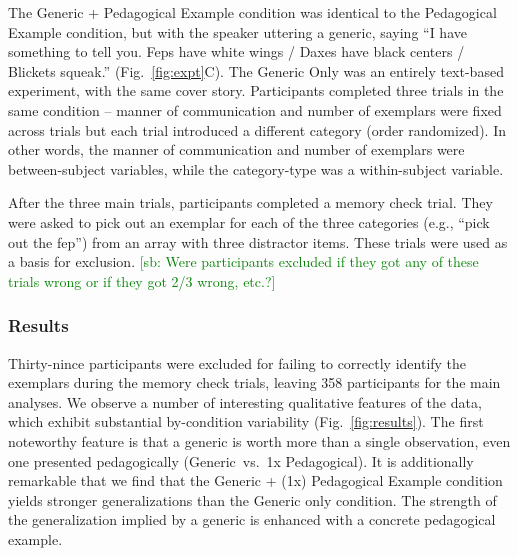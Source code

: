 \documentclass[10pt,letterpaper]{article}
\newcommand{\soph}[1]{\textcolor{Green}{[sb: #1]}}
\begin{document}
The Generic + Pedagogical Example condition was identical to the Pedagogical Example condition, but with the speaker uttering a generic, saying ``I have something to tell you. Feps have white wings / Daxes have black centers / Blickets squeak.'' (Fig.~\ref{fig:expt}C). 
The Generic Only was an entirely text-based experiment, with the same cover story. 
Participants completed three trials in the same condition -- manner of communication and number of exemplars were fixed across trials but each trial introduced a different category (order randomized). In other words, the manner of communication and number of exemplars were between-subject variables, while the category-type was a within-subject variable. 

After the three main trials, participants completed a memory check trial. They were asked to pick out an exemplar for each of the three categories (e.g., ``pick out the fep'') from an array with three distractor items. These trials were used as a basis for exclusion. \soph{Were participants excluded if they got any of these trials wrong or if they got 2/3 wrong, etc.?}










\subsubsection{Results}



Thirty-nince participants were excluded for failing to correctly identify the exemplars during the memory check trials, leaving 358 participants for the main analyses.
We observe a number of interesting qualitative features of the data, which exhibit substantial by-condition variability (Fig.~\ref{fig:results}). 
The first noteworthy feature is that a generic is worth more than a single observation, even one presented pedagogically (Generic~vs.~1x Pedagogical). 
It is additionally remarkable that we find that the Generic + (1x) Pedagogical Example condition yields stronger generalizations than the Generic only condition. 
The strength of the generalization implied by a generic is enhanced with a concrete pedagogical example. 
\end{document}
